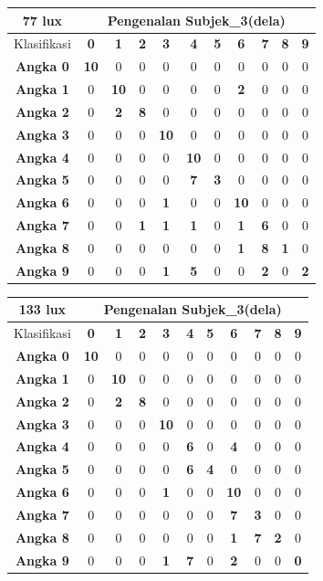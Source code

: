 \begin{tabular}{|c|c|c|c|c|c|c|c|c|c|c|}
	\hline 77 lux
	& \multicolumn{10}{|c|}{Pengenalan Subjek\_3(dela)} \\
	\hline  Klasifikasi&\textbf{0} &\textbf{1} &\textbf{2} &\textbf{3} &\textbf{4}&\textbf{5} &\textbf{6}&\textbf{7}&\textbf{8}&\textbf{9}\\
	\hline \textbf{Angka 0} &\textbf{10} &0 &0 &0&0&0&0&0&0&0\\
	\hline \textbf{Angka 1} &0 &\textbf{10} &0 &0&0&0&\textbf{2}&0&0&0\\
	\hline \textbf{Angka 2} &0 &\textbf{2} &\textbf{8} &0 &0&0 &0&0&0&0\\
	\hline \textbf{Angka 3} &0 &0 &0 &\textbf{10} &0&0 &0&0&0&0\\
	\hline \textbf{Angka 4} &0 &0 &0 &0 &\textbf{10}&0&0&0&0&0\\
	\hline \textbf{Angka 5} &0 &0 &0 &0 &\textbf{7} &\textbf{3}&0&0&0&0\\
	\hline \textbf{Angka 6} &0 &0 &0 &\textbf{1} &0 &0&\textbf{10}&0&0&0\\
	\hline \textbf{Angka 7} &0 &0 &\textbf{1} &\textbf{1} &\textbf{1} &0&\textbf{1}&\textbf{6}&0&0\\
	\hline \textbf{Angka 8} &0 &0 &0 &0&0&0&\textbf{1}&\textbf{8}&\textbf{1}&0 \\
	\hline \textbf{Angka 9} &0 &0 &0 &\textbf{1}&\textbf{5}&0&0&\textbf{2}&0&\textbf{2} \\
	\hline
\end{tabular}

\begin{tabular}{|c|c|c|c|c|c|c|c|c|c|c|}
	\hline 133 lux
	& \multicolumn{10}{|c|}{Pengenalan Subjek\_3(dela)} \\
	\hline  Klasifikasi&\textbf{0} &\textbf{1} &\textbf{2} &\textbf{3} &\textbf{4}&\textbf{5} &\textbf{6}&\textbf{7}&\textbf{8}&\textbf{9}\\
	\hline \textbf{Angka 0} &\textbf{10} &0 &0 &0&0&0&0&0&0&0\\
	\hline \textbf{Angka 1} &0 &\textbf{10} &0 &0&0&0&0&0&0&0\\
	\hline \textbf{Angka 2} &0 &\textbf{2} &\textbf{8} &0 &0&0 &0&0&0&0\\
	\hline \textbf{Angka 3} &0 &0 &0 &\textbf{10} &0&0 &0&0&0&0\\
	\hline \textbf{Angka 4} &0 &0 &0 &0 &\textbf{6}&0&\textbf{4}&0&0&0\\
	\hline \textbf{Angka 5} &0 &0 &0 &0 &\textbf{6} &\textbf{4}&0&0&0&0\\
	\hline \textbf{Angka 6} &0 &0 &0 &\textbf{1} &0 &0&\textbf{10}&0&0&0\\
	\hline \textbf{Angka 7} &0 &0 &0 &0 &0 &0&\textbf{7}&\textbf{3}&0&0\\
	\hline \textbf{Angka 8} &0 &0 &0 &0&0&0&\textbf{1}&\textbf{7}&\textbf{2}&0 \\
	\hline \textbf{Angka 9} &0 &0 &0 &\textbf{1}&\textbf{7}&0&\textbf{2}&0&0&\textbf{0} \\
	\hline
\end{tabular}

